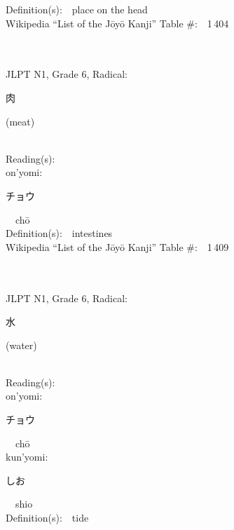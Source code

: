 \begin{multicols}{2}
Definition(s):\ \ place on the head \\
Wikipedia ``List of the J\=oy\=o Kanji'' Table \#:\ \ 1\,404 \\
\ \ \\
{\fontsize{34pt}{40pt}  }\ \ \\  %
{JLPT N1, Grade 6, Radical:\ \ {\begin{CJK}{UTF8}{min} 肉 \end{CJK}} (meat) } \\
Reading(s):\ \ \\
{\hspace*{1em}}on'yomi:\ \ \\
{\hspace*{2em}}{\begin{CJK}{UTF8}{min} チョウ \end{CJK}}\ \ ch\=o\ \ \\
Definition(s):\ \ intestines \\
Wikipedia ``List of the J\=oy\=o Kanji'' Table \#:\ \ 1\,409 \\
\ \ \\
{\fontsize{34pt}{40pt}  }\ \ \\  %
{JLPT N1, Grade 6, Radical:\ \ {\begin{CJK}{UTF8}{min} 水 \end{CJK}} (water) } \\
Reading(s):\ \ \\
{\hspace*{1em}}on'yomi:\ \ \\
{\hspace*{2em}}{\begin{CJK}{UTF8}{min} チョウ \end{CJK}}\ \ ch\=o\ \ \\
{\hspace*{1em}}kun'yomi:\ \ \\
{\hspace*{2em}}{\begin{CJK}{UTF8}{min} しお \end{CJK}}\ \ shio\ \ \\
Definition(s):\ \ tide \\

\end{multicols}
